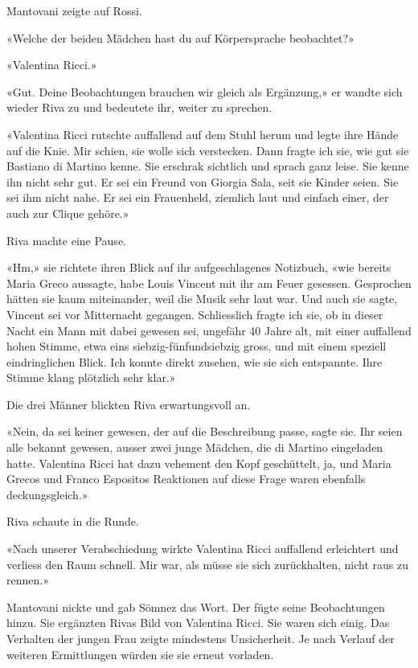 Mantovani zeigte auf Rossi.

«Welche der beiden Mädchen hast du auf Körpersprache beobachtet?»

«Valentina Ricci.»

«Gut. Deine Beobachtungen brauchen wir gleich als Ergänzung,» er wandte
sich wieder Riva zu und bedeutete ihr, weiter zu sprechen.

«Valentina Ricci rutschte auffallend auf dem Stuhl herum und legte ihre
Hände auf die Knie. Mir schien, sie wolle sich verstecken. Dann fragte
ich sie, wie gut sie Bastiano di Martino kenne. Sie erschrak sichtlich
und sprach ganz leise. Sie kenne ihn nicht sehr gut. Er sei ein Freund
von Giorgia Sala, seit sie Kinder seien. Sie sei ihm nicht nahe. Er sei
ein Frauenheld, ziemlich laut und einfach einer, der auch zur Clique
gehöre.»

Riva machte eine Pause.

«Hm,» sie richtete ihren Blick auf ihr aufgeschlagenes Notizbuch, «wie
bereits Maria Greco aussagte, habe Louis Vincent mit ihr am Feuer
gesessen. Gesprochen hätten sie kaum miteinander, weil die Musik sehr
laut war. Und auch sie sagte, Vincent sei vor Mitternacht gegangen.
Schliesslich fragte ich sie, ob in dieser Nacht ein Mann mit dabei
gewesen sei, ungefähr 40 Jahre alt, mit einer auffallend hohen Stimme,
etwa eins siebzig-fünfundsiebzig gross, und mit einem speziell
eindringlichen Blick. Ich konnte direkt zusehen, wie sie sich
entspannte. Ihre Stimme klang plötzlich sehr klar.»

Die drei Männer blickten Riva erwartungsvoll an.

«Nein, da sei keiner gewesen, der auf die Beschreibung passe, sagte sie.
Ihr seien alle bekannt gewesen, ausser zwei junge Mädchen, die di
Martino eingeladen hatte. Valentina Ricci hat dazu vehement den Kopf
geschüttelt, ja, und Maria Grecos und Franco Espositos Reaktionen auf
diese Frage waren ebenfalls deckungsgleich.»

Riva schaute in die Runde.

«Nach unserer Verabschiedung wirkte Valentina Ricci auffallend
erleichtert und verliess den Raum schnell. Mir war, als müsse sie sich
zurückhalten, nicht raus zu rennen.»

Mantovani nickte und gab Sömnez das Wort. Der fügte seine Beobachtungen
hinzu. Sie ergänzten Rivas Bild von Valentina Ricci. Sie waren sich
einig. Das Verhalten der jungen Frau zeigte mindestens Unsicherheit. Je
nach Verlauf der weiteren Ermittlungen würden sie sie erneut vorladen.

